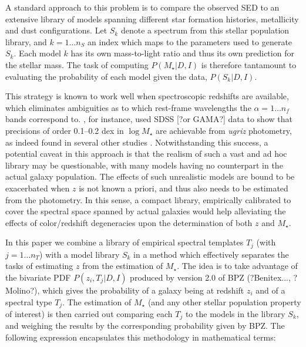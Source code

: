 \documentclass[a4paper, useAMS, usenatbib, hyperpdf]{mn2e}
\begin{document}
A standard approach to this problem is to compare the observed SED to an extensive library of models spanning different star formation histories, metallicity and dust configurations. Let $S_k$ denote a spectrum from this stellar population library, and $k = 1 \ldots n_S$ an index which maps to the parameters used to generate $S_k$. Each model $k$ has its own mass-to-light ratio and thus its own prediction for the stellar mass. The task of computing $P(M_\star | D, I)$ is therefore tantamount to evaluating the probability of each model given the data, $P(S_k | D, I)$. 

This  strategy is known to work well when spectroscopic redshifts are available, which eliminates ambiguities as to which rest-frame wavelengths the $\alpha = 1\ldots n_f$ bands correspond to. \cite{Taylor.etal.2011a}, for instance, used SDSS [?or GAMA?] data to show that precisions of order 0.1--0.2 dex in $\log M_\star$ are achievable from {\it ugriz} photometry, as indeed found in several other studies \citep{Gallazzi.Bell.2009a}. Notwithstanding this success, a potential caveat in this approach is that the realism of such a vast and ad hoc library may be questionable, with many models having no counterpart in the actual galaxy population. 
The effects of such unrealistic models are bound to be exacerbated when $z$ is not known a priori, and thus also needs to be estimated from the photometry. In this sense, a compact library, empirically calibrated to cover the spectral space spanned by actual galaxies would help alleviating the  effects of color/redshift degeneracies upon the determination of both $z$ and $M_\star$. 

In this paper we combine a library of empirical spectral templates $T_j$ (with $j = 1 \ldots n_T$) with a model library $S_k$  in a method which effectively separates the tasks of estimating $z$ from the estimation of $M_\star$. The idea is to take advantage of the bivariate PDF $P(z_i,T_j | D,I)$ produced by version 2.0 of BPZ (?Benitex..., ?Molino?), which gives the probability of a galaxy being at redshift $z_i$ and of a spectral type $T_j$. The estimation of $M_\star$ (and any other stellar population property of interest) is then carried out comparing each $T_j$ to the models in the library $S_k$, and weighing the results by the corresponding probability given by BPZ. 
The following expression encapsulates this methodology in  mathematical terms:

\end{document}
